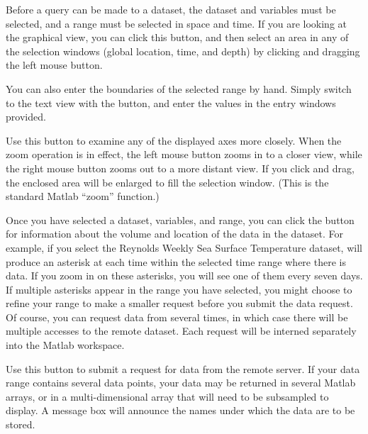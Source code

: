 \begin{description}


Before a query can be made to a dataset, the dataset and variables
must be selected, and a range must be selected in space and time. If
you are looking at the graphical view, you can click this button, and
then select an area in any of the selection windows (global location,
time, and depth) by clicking and dragging the left mouse button.

You can also enter the boundaries of the selected range by
hand. Simply switch to the text view with the  button,
and enter the values in the entry windows provided. 


Use this button to examine any of the displayed axes more closely.
When the zoom operation is in effect, the left mouse button zooms in
to a closer view, while the right mouse button zooms out to a more
distant view. If you click and drag, the enclosed area will be
enlarged to fill the selection window. (This is the standard Matlab
``zoom'' function.)  



Once you have selected a dataset, variables, and range, you can click
the  button for information about the volume and
location of the data in the dataset. For example, if you select the
Reynolds Weekly Sea Surface Temperature dataset, 
will produce an asterisk at each time within the selected time range
where there is data. If you zoom in on these asterisks, you will see
one of them every seven days. If multiple asterisks appear in the
range you have selected, you might choose to refine your range to make
a smaller request before you submit the data request. Of course, you
can request data from several times, in which case there will be
multiple accesses to the remote dataset. Each request will be interned
separately into the Matlab workspace.


Use this button to submit a request for data from the remote server.
If your data range contains several data points, your data may be
returned in several Matlab arrays, or in a multi-dimensional array
that will need to be subsampled to display. A message box will
announce the names under which the data are to be stored.


\end{description}

